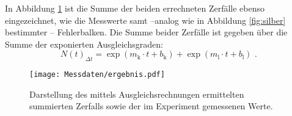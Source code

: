 In Abbildung \ref{fig:ergebnis} ist die Summe der beiden errechneten Zerfälle ebenso eingezeichnet, wie die Messwerte samt --analog wie in Abbildung \ref{fig:silber} bestimmter -- Fehlerbalken.
Die Summe beider Zerfälle ist gegeben über die Summe der exponierten Ausgleichsgraden:
\begin{equation*}
	N(t)_{\Delta t}=\exp{(m_\mathrm{k}\cdot t+b_\mathrm{k})}+ \exp{(m_\mathrm{l}\cdot t+b_\mathrm{l})}\text{ .}
\end{equation*}


\begin{figure}
  \centering
  \texttt{[image: Messdaten/ergebnis.pdf]}
  \caption{Darstellung des mittels Ausgleichsrechnungen ermittelten summierten Zerfalls sowie der im Experiment gemessenen Werte.}
  \label{fig:ergebnis}
\end{figure}




